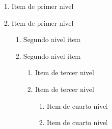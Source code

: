 \documentclass[a4,11pt]{aleph-notas-alpha}
\begin{document}
\begin{tcbLaTeXb}
 \begin{enumerate}
   \item 
        Item de primer nivel
   \item
        Item de primer nivel
   \begin{enumerate}
    \item
        Segundo nivel item
    \item
        Segundo nivel item
     \begin{enumerate}
       \item Item de tercer nivel
       \item Item de tercer nivel
       \begin{enumerate}
         \item Item de cuarto nivel
         \item Item de cuarto nivel
       \end{enumerate}
     \end{enumerate}
   \end{enumerate}
 \end{enumerate}
\end{tcbLaTeXb}
\end{document}
